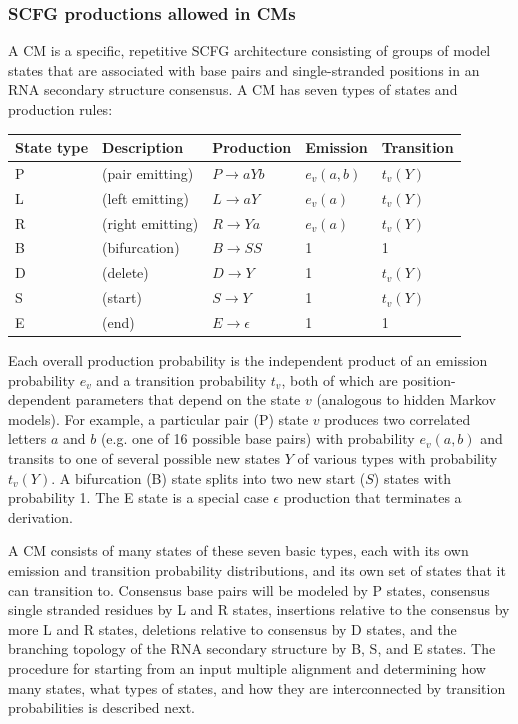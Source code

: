 \subsubsection{SCFG productions allowed in CMs}

A CM is a specific, repetitive SCFG architecture consisting of groups
of model states that are associated with base pairs and
single-stranded positions in an RNA secondary structure consensus. A
CM has seven types of states and production rules:

\vspace{0.5em}
\begin{center}
\begin{tabular}{lllll}
State type & Description             &  Production             & Emission & Transition\\ \hline
P & (pair emitting)   & $P \rightarrow a Y b$ & $e_v(a,b)$ & $t_v(Y)$  \\
L & (left emitting)   & $L \rightarrow a Y$   & $e_v(a)$   & $t_v(Y)$  \\
R & (right emitting)  & $R \rightarrow Y a$   & $e_v(a)$   & $t_v(Y)$  \\
B & (bifurcation)     & $B \rightarrow S S$   & 1     &     1     \\
D & (delete)          & $D \rightarrow Y$     & 1     &   $t_v(Y)$  \\
S & (start)           & $S \rightarrow Y$     &    1     & $t_v(Y)$  \\
E & (end)             & $E \rightarrow \epsilon$ & 1     &     1     \\
\end{tabular}
\end{center}
\vspace{0.5em}

Each overall production probability is the independent product of an
emission probability $e_v$ and a transition probability $t_v$, both of
which are position-dependent parameters that depend on the state $v$
(analogous to hidden Markov models). For example, a particular pair
(P) state $v$ produces two correlated letters $a$ and $b$ (e.g. one of
16 possible base pairs) with probability $e_v(a,b)$ and transits to
one of several possible new states $Y$ of various types with
probability $t_v(Y)$.  A bifurcation (B) state splits into two new
start ($S$) states with probability 1.  The E state is a special case
$\epsilon$ production that terminates a derivation.

A CM consists of many states of these seven basic types, each with its
own emission and transition probability distributions, and its own set
of states that it can transition to. Consensus base pairs will be
modeled by P states, consensus single stranded residues by L and R
states, insertions relative to the consensus by more L and R states,
deletions relative to consensus by D states, and the branching
topology of the RNA secondary structure by B, S, and E states. The
procedure for starting from an input multiple alignment and
determining how many states, what types of states, and how they are
interconnected by transition probabilities is described next.

